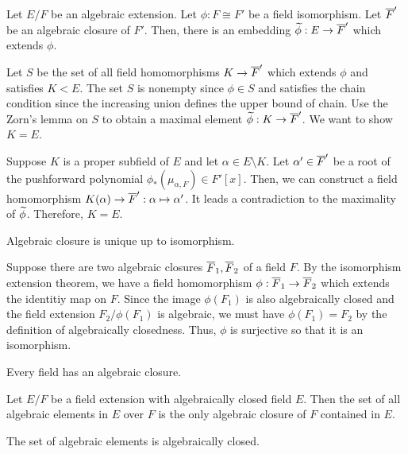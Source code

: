\documentclass{../exp}
\begin{document}
\begin{rd}
\begin{thm}
Let $E/F$ be an algebraic extension.
Let $\phi:F\cong F'$ be a field isomorphism.
Let $\overline F'$ be an algebraic closure of $F'$.
Then, there is an embedding $\tld\phi:E\to\cl F'$ which extends $\phi$.
\end{thm}
\begin{pf}
Let $S$ be the set of all field homomorphisms $K\to\cl F'$ which extends $\phi$ and satisfies $K<E$.
The set $S$ is nonempty since $\phi\in S$ and satisfies the chain condition since the increasing union defines the upper bound of chain.
Use the Zorn's lemma on $S$ to obtain a maximal element $\tld\phi:K\to\cl F'$.
We want to show $K=E$.

Suppose $K$ is a proper subfield of $E$ and let $\alpha\in E\setminus K$.
Let $\alpha'\in\overline F'$ be a root of the pushforward polynomial $\phi_*(\mu_{\alpha,F})\in F'[x]$.
Then, we can construct a field homomorphism $K(\alpha)\to\cl F':\alpha\mapsto\alpha'$.
It leads a contradiction to the maximality of $\widetilde\phi$.
Therefore, $K=E$.
\end{pf}


\begin{thm}
Algebraic closure is unique up to isomorphism.
\end{thm}
\begin{pf}
Suppose there are two algebraic closures $\overline F_1, \overline F_2$ of a field $F$.
By the isomorphism extension theorem, we have a field homomorphism $\phi:\cl F_1\to\cl F_2$ which extends the identitiy map on $F$.
Since the image $\phi(F_1)$ is also algebraically closed and the field extension $F_2/\phi(F_1)$ is algebraic, we must have $\phi(F_1)=F_2$ by the definition of algebraically closedness.
Thus, $\phi$ is surjective so that it is an isomorphism.
\end{pf}

\begin{thm}
Every field has an algebraic closure.
\end{thm}
\begin{pf}
\end{pf}



\begin{prop}
Let $E/F$ be a field extension with algebraically closed field $E$.
Then the set of all algebraic elements in $E$ over $F$ is the only algebraic closure of $F$ contained in $E$.
\end{prop}
\begin{pf}
The set of algebraic elements is algebraically closed.
\end{pf}


\end{rd}
\end{document}
